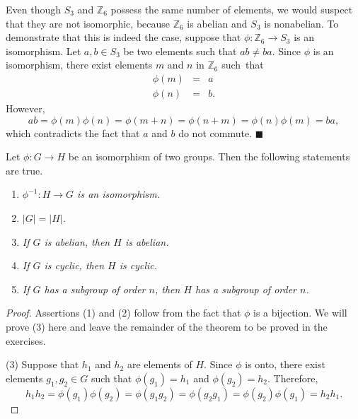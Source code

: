 Even though $S_3$ and ${\mathbb Z}_6$ possess the same number of elements, we would suspect that they are not isomorphic, because ${\mathbb Z}_6$ is abelian and $S_3$ is nonabelian.  To demonstrate that this is indeed the case, suppose that $\phi : {\mathbb Z}_6 \rightarrow  S_3$ is an isomorphism.  Let $a , b \in S_3$ be two elements such that $ab \neq ba$.  Since $\phi$ is an isomorphism, there exist elements $m$ and $n$ in ${\mathbb Z}_6$ such~that 
\begin{eqnarray*}
\phi( m ) & = & a \\
\phi( n ) & = & b.
\end{eqnarray*}
However,
$$
ab = \phi(m ) \phi(n) = \phi(m + n) = \phi(n + m) = \phi(n )
\phi(m) = ba,
$$
which contradicts the fact that $a$ and $b$ do not commute.
\hspace{\fill} $\blacksquare$

\begin{theorem}\label{isomorph_theorem_1}
Let $\phi : G \rightarrow H$ be an isomorphism of two groups.  Then the following statements are true. 
\begin{enumerate}
 
\rm \item \it
$\phi^{-1} : H \rightarrow G$ is an isomorphism. 

\rm \item \it
$|G| = |H|$. 

\rm \item \it
If $G$ is abelian, then $H$ is abelian. 

\rm \item \it
If $G$ is cyclic, then $H$ is cyclic. 

\rm \item \it
If $G$ has a subgroup of order $n$, then $H$ has a subgroup of order $n$.
 
\end{enumerate}
\end{theorem}

\begin{proof}
Assertions (1) and (2) follow from the fact that $\phi$ is a bijection.  We will prove (3) here and leave the remainder of the theorem to be proved in the exercises.
 
(3)
Suppose that $h_1$ and $h_2$ are elements of $H$.  Since $\phi$ is onto, there exist elements $g_1, g_2 \in G$ such that $\phi(g_1) = h_1$ and $\phi(g_2) = h_2$.  Therefore, 
$$
h_1 h_2 = \phi(g_1) \phi(g_2) =  \phi(g_1 g_2) = \phi(g_2 g_1) = \phi(g_2) \phi(g_1) = h_2 h_1. 
$$
\end{proof}

